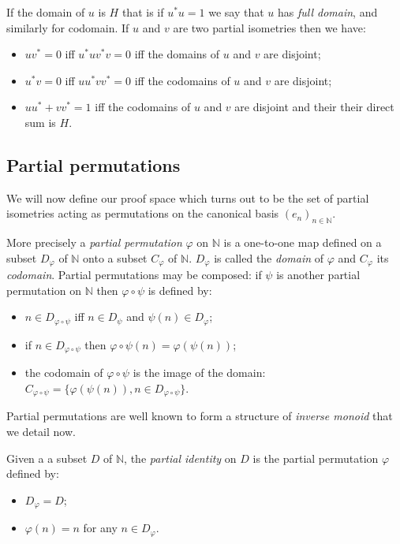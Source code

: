 If the domain of \(u\) is \(H\) that is if \(u^* u = 1\) we say that
\(u\) has \emph{full domain}, and similarly for codomain. If \(u\) and
\(v\) are two partial isometries then we have:
\begin{itemize}
\item \(uv^* = 0\) iff \(u^*uv^*v = 0\) iff the domains of \(u\) and \(v\)
  are disjoint;
\item \(u^*v = 0\) iff \(uu^*vv^* = 0\) iff the codomains of \(u\) and \(v\)
  are disjoint;
\item \(uu^* + vv^* = 1\) iff the codomains of \(u\) and \(v\) are disjoint
  and their their direct sum is \(H\).
\end{itemize}


\subsection{Partial permutations}\label{partial-permutations}

We will now define our proof space which turns out to be the set of
partial isometries acting as permutations on the canonical basis
\((e_n)_{n\in\mathbb{N}}\).

More precisely a \emph{partial permutation} \(\varphi\) on
\(\mathbb{N}\) is a one-to-one map defined on a subset \(D_\varphi\) of
\(\mathbb{N}\) onto a subset \(C_\varphi\) of \(\mathbb{N}\).
\(D_\varphi\) is called the \emph{domain} of \(\varphi\) and
\(C_\varphi\) its \emph{codomain}. Partial permutations may be composed:
if \(\psi\) is another partial permutation on \(\mathbb{N}\) then
\(\varphi\circ\psi\) is defined by:
\begin{itemize}
\item \(n\in D_{\varphi\circ\psi}\) iff \(n\in D_\psi\) and
  \(\psi(n)\in D_\varphi\);
\item if \(n\in D_{\varphi\circ\psi}\) then
  \(\varphi\circ\psi(n) = \varphi(\psi(n))\);
\item the codomain of \(\varphi\circ\psi\) is the image of the domain:
  \(C_{\varphi\circ\psi} = \{\varphi(\psi(n)), n\in D_{\varphi\circ\psi}\}\).
\end{itemize}

Partial permutations are well known to form a structure of \emph{inverse
monoid} that we detail now.

Given a a subset \(D\) of \(\mathbb{N}\), the \emph{partial identity} on
\(D\) is the partial permutation \(\varphi\) defined by:
\begin{itemize}
\item \(D_\varphi = D\);
\item \(\varphi(n) = n\) for any \(n\in D_\varphi\).
\end{itemize}

